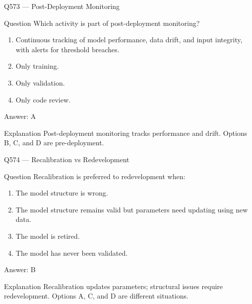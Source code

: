 \documentclass[aspectratio=169,8pt]{beamer}
\begin{document}
	\begin{frame}{Q573 --- Post-Deployment Monitoring}
		\begin{block}{Question}
			Which activity is part of post-deployment monitoring?
			\begin{enumerate}
				\item Continuous tracking of model performance, data drift, and input integrity, with alerts for threshold breaches.
				\item Only training.
				\item Only validation.
				\item Only code review.
			\end{enumerate}
		\end{block}
		\begin{exampleblock}{Answer: A}\end{exampleblock}
		\begin{block}{Explanation}
			Post-deployment monitoring tracks performance and drift. Options B, C, and D are pre-deployment.
		\end{block}
	\end{frame}
	
	\begin{frame}{Q574 --- Recalibration vs Redevelopment}
		\begin{block}{Question}
			Recalibration is preferred to redevelopment when:
			\begin{enumerate}
				\item The model structure is wrong.
				\item The model structure remains valid but parameters need updating using new data.
				\item The model is retired.
				\item The model has never been validated.
			\end{enumerate}
		\end{block}
		\begin{exampleblock}{Answer: B}\end{exampleblock}
		\begin{block}{Explanation}
			Recalibration updates parameters; structural issues require redevelopment. Options A, C, and D are different situations.
		\end{block}
	\end{frame}
	
\end{document}
